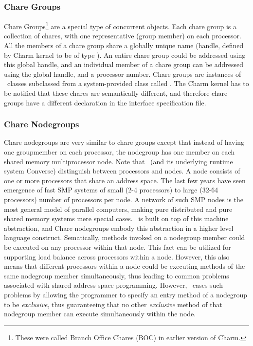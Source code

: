 \subsubsection{Chare Groups}

Chare Groups\footnote{ These were called Branch Office Chares (BOC) in earlier
version of Charm.  } are a special type of concurrent objects.  Each chare
group is a collection of chares, with one representative (group member) on each
processor. All the members of a chare group share a globally unique name
(handle, defined by Charm kernel to be of type ). An entire
chare group could be addressed using this global handle, and an individual
member of a chare group can be addressed using the global handle, and a
processor number. Chare groups are instances of \CC\ classes subclassed from a
system-provided class called . The Charm kernel has to be notified
that these chares are semantically different, and therefore chare groups have a
different declaration in the interface specification file.

\subsubsection{Chare Nodegroups}

Chare nodegroups are very similar to chare groups except that instead of having
one groupmember on each processor, the nodegroup has one member on each shared
memory multiprocessor node. Note that \charmpp\ (and its underlying runtime
system Converse) distinguish between processors and nodes. A node consists of
one or more processors that share an address space. The last few years have
seen emergence of fast SMP systems of small (2-4 processors) to large (32-64
processors) number of processors per node. A network of such SMP nodes is the
most general model of parallel computers, making pure distributed and pure
shared memory systems mere special cases. \charmpp\ is built on top of this
machine abstraction, and Chare nodegroups embody this abstraction in a higher
level language construct. Sematically, methods invoked on a nodegroup member
could be executed on any processor within that node. This fact can be utilized
for supporting load balance across processors within a node. However, this also
means that different processors within a node could be executing methods of the
same nodegroup member simultaneously, thus leading to common problems
associated with shared address space programming. However, \charmpp\ eases such
problems by allowing the programmer to specify an entry method of a nodegroup
to be {\em exclusive}, thus guaranteeing that no other {\em exclusive} method
of that nodegroup member can execute simultaneously within the node.

